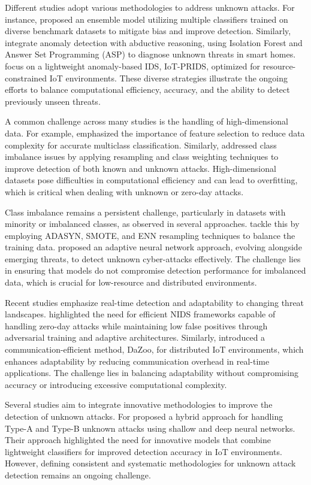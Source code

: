 Different studies adopt various methodologies to address unknown attacks. For instance, \citet{ahmad2022deep} proposed an ensemble model utilizing multiple classifiers trained on diverse benchmark datasets to mitigate bias and improve detection. Similarly, \citet{ramkumar2024diagnosing} integrate anomaly detection with abductive reasoning, using Isolation Forest and Answer Set Programming (ASP) to diagnose unknown threats in smart homes. \citet{zohourian2024iot} focus on a lightweight anomaly-based IDS, IoT-PRIDS, optimized for resource-constrained IoT environments. These diverse strategies illustrate the ongoing efforts to balance computational efficiency, accuracy, and the ability to detect previously unseen threats.

A common challenge across many studies is the handling of high-dimensional data. For example, \citet{samantaray2024comparative} emphasized the importance of feature selection to reduce data complexity for accurate multiclass classification. Similarly, \citet{kamal2024advanced} addressed class imbalance issues by applying resampling and class weighting techniques to improve detection of both known and unknown attacks. High-dimensional datasets pose difficulties in computational efficiency and can lead to overfitting, which is critical when dealing with unknown or zero-day attacks.

Class imbalance remains a persistent challenge, particularly in datasets with minority or imbalanced classes, as observed in several approaches. \citet{kamal2024advanced} tackle this by employing ADASYN, SMOTE, and ENN resampling techniques to balance the training data. \citet{nie2024intrusion} proposed an adaptive neural network approach, evolving alongside emerging threats, to detect unknown cyber-attacks effectively. The challenge lies in ensuring that models do not compromise detection performance for imbalanced data, which is crucial for low-resource and distributed environments.

Recent studies emphasize real-time detection and adaptability to changing threat landscapes. \citet{wu2024current} highlighted the need for efficient NIDS frameworks capable of handling zero-day attacks while maintaining low false positives through adversarial training and adaptive architectures. Similarly, \citet{dang2024adaptive} introduced a communication-efficient method, DaZoo, for distributed IoT environments, which enhances adaptability by reducing communication overhead in real-time applications. The challenge lies in balancing adaptability without compromising accuracy or introducing excessive computational complexity.

Several studies aim to integrate innovative methodologies to improve the detection of unknown attacks. For \citet{al2020unknown} proposed a hybrid approach for handling Type-A and Type-B unknown attacks using shallow and deep neural networks. Their approach highlighted the need for innovative models that combine lightweight classifiers for improved detection accuracy in IoT environments. However, defining consistent and systematic methodologies for unknown attack detection remains an ongoing challenge.